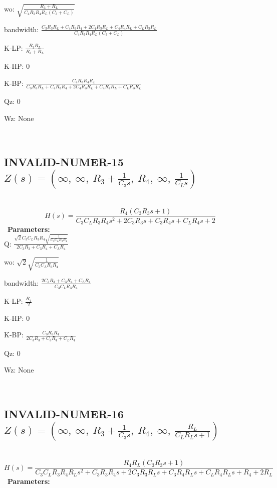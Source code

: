 \documentclass{article}
\begin{document}
wo: $\sqrt{\frac{R_{3} + R_{L}}{C_{4} R_{3} R_{4} R_{L} \left(C_{3} + C_{L}\right)}}$\ 

bandwidth: $\frac{C_{3} R_{3} R_{L} + C_{4} R_{3} R_{4} + 2 C_{4} R_{3} R_{L} + C_{4} R_{4} R_{L} + C_{L} R_{3} R_{L}}{C_{4} R_{3} R_{4} R_{L} \left(C_{3} + C_{L}\right)}$\ 

K-LP: $\frac{R_{3} R_{L}}{R_{3} + R_{L}}$\ 

K-HP: $0$\ 

K-BP: $\frac{C_{4} R_{3} R_{4} R_{L}}{C_{3} R_{3} R_{L} + C_{4} R_{3} R_{4} + 2 C_{4} R_{3} R_{L} + C_{4} R_{4} R_{L} + C_{L} R_{3} R_{L}}$\ 

Qz: $0$\ 

Wz: $\text{None}$\ 

\ 

\subsection{INVALID-NUMER-15 $Z(s) = \left( \infty, \  \infty, \  R_{3} + \frac{1}{C_{3} s}, \  R_{4}, \  \infty, \  \frac{1}{C_{L} s}\right)$ } \ 
\textbf{\[H(s) = \frac{R_{4} \left(C_{3} R_{3} s + 1\right)}{C_{3} C_{L} R_{3} R_{4} s^{2} + 2 C_{3} R_{3} s + C_{3} R_{4} s + C_{L} R_{4} s + 2}\] } \ 
\textbf{Parameters:}\\ 

Q: $\frac{\sqrt{2} C_{3} C_{L} R_{3} R_{4} \sqrt{\frac{1}{C_{3} C_{L} R_{3} R_{4}}}}{2 C_{3} R_{3} + C_{3} R_{4} + C_{L} R_{4}}$\ 

wo: $\sqrt{2} \sqrt{\frac{1}{C_{3} C_{L} R_{3} R_{4}}}$\ 

bandwidth: $\frac{2 C_{3} R_{3} + C_{3} R_{4} + C_{L} R_{4}}{C_{3} C_{L} R_{3} R_{4}}$\ 

K-LP: $\frac{R_{4}}{2}$\ 

K-HP: $0$\ 

K-BP: $\frac{C_{3} R_{3} R_{4}}{2 C_{3} R_{3} + C_{3} R_{4} + C_{L} R_{4}}$\ 

Qz: $0$\ 

Wz: $\text{None}$\ 

\ 

\subsection{INVALID-NUMER-16 $Z(s) = \left( \infty, \  \infty, \  R_{3} + \frac{1}{C_{3} s}, \  R_{4}, \  \infty, \  \frac{R_{L}}{C_{L} R_{L} s + 1}\right)$ } \ 
\textbf{\[H(s) = \frac{R_{4} R_{L} \left(C_{3} R_{3} s + 1\right)}{C_{3} C_{L} R_{3} R_{4} R_{L} s^{2} + C_{3} R_{3} R_{4} s + 2 C_{3} R_{3} R_{L} s + C_{3} R_{4} R_{L} s + C_{L} R_{4} R_{L} s + R_{4} + 2 R_{L}}\] } \ 
\textbf{Parameters:}\\ 
\end{document}
